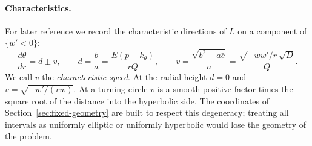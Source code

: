 \paragraph{Characteristics.}
For later reference we record the characteristic directions of
$\bar L$ on a component of $\{w'<0\}$:
\begin{equation}\label{eq:completed-characteristics}
 \frac{d\theta}{dr}=d\pm v,\qquad
 d=\frac ba=\frac{E(p-k_\theta)}{rQ},\qquad
 v=\frac{\sqrt{b^2-a\bar c}}{a}
  =\frac{\sqrt{-ww'/r}\,\sqrt D}{Q}.
\end{equation}
We call $v$ the \emph{characteristic speed}. At the radial height
$d=0$ and $v=\sqrt{-w'/(rw)}$. At a turning circle $v$ is a smooth
positive factor times the square root of the distance into the
hyperbolic side. The coordinates of
Section~\ref{sec:fixed-geometry} are built to respect this
degeneracy; treating all intervals as uniformly elliptic or uniformly
hyperbolic would lose the geometry of the problem.
